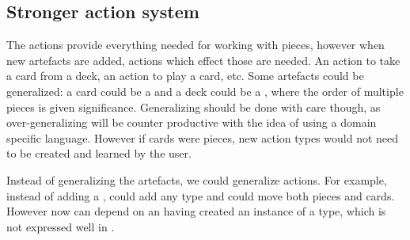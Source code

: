\subsection{Stronger action system}
\label{sec:strongeractionsystem}

The actions provide everything needed for working with pieces, however
when new artefacts are added, actions which effect those are needed.
An action to take a card from a deck, an action to play a card, etc.
Some artefacts could be generalized: a card could be a 
and a deck could be a , where the order of multiple pieces
is given significance. Generalizing should be done with care though, as
over-generalizing will be counter productive with the idea of using a
domain specific language. However if cards were pieces, new action types
would not need to be created and learned by the user.

Instead of generalizing the artefacts, we could generalize actions. For example, instead of  adding a ,  could add any type and  could move both pieces and cards. However now  can depend on an  having created an instance of a type, which is not expressed well in .
